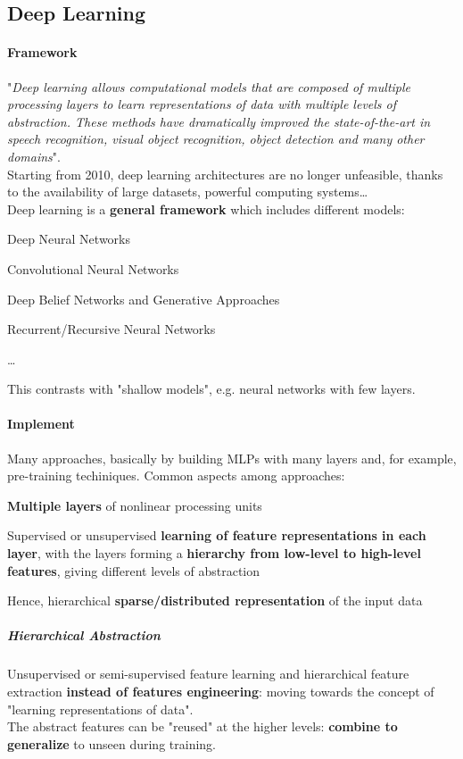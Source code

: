 \documentclass[10pt]{report}
\begin{document}
\subsection{Deep Learning}
\paragraph{Framework} "\textit{Deep learning  allows computational models that are composed of
multiple processing layers to learn representations of data with multiple levels of abstraction. These methods have dramatically improved the state-of-the-art in speech recognition, visual object recognition, object detection and many other domains}".\\
Starting from 2010, deep learning architectures are no longer unfeasible, thanks to the availability of large datasets, powerful computing systems\ldots\\
Deep learning is a \textbf{general framework} which includes different models:
\begin{list}{}{}
	\item Deep Neural Networks
	\item Convolutional Neural Networks
	\item Deep Belief Networks and Generative Approaches
	\item Recurrent/Recursive Neural Networks
	\item \ldots
\end{list}
This contrasts with "shallow models", e.g. neural networks with few layers.
\paragraph{Implement} Many approaches, basically by building MLPs with many layers and, for example, pre-training techiniques. Common aspects among approaches:
\begin{list}{}{}
	\item \textbf{Multiple layers} of nonlinear processing units
	\item Supervised or unsupervised \textbf{learning of feature representations in each layer}, with the layers forming a \textbf{hierarchy from low-level to high-level features}, giving different levels of abstraction
	\item Hence, hierarchical \textbf{sparse/distributed representation} of the input data
\end{list}
\subparagraph{Hierarchical Abstraction} Unsupervised or semi-supervised feature learning and hierarchical feature extraction \textbf{instead of features engineering}: moving towards the concept of "learning representations of data".\\
The abstract features can be "reused" at the higher levels: \textbf{combine to generalize} to unseen during training.
\end{document}
